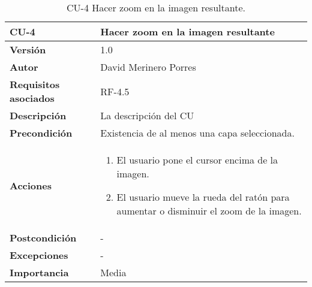 \begin{table}[p]
	\centering
	\begin{tabularx}{\linewidth}{ p{} p{} }
		\toprule
		\textbf{CU-4}    & \textbf{Hacer zoom en la imagen resultante}\\
		\toprule
		\textbf{Versión}              & 1.0    \\
		\textbf{Autor}                & David Merinero Porres \\
		\textbf{Requisitos asociados} & RF-4.5 \\
		\textbf{Descripción}          & La descripción del CU \\
		\textbf{Precondición}         & Existencia de al menos una capa seleccionada. \\
		\textbf{Acciones}             &
		\begin{enumerate}
			\def\labelenumi{\arabic{enumi}.}
			\tightlist
			\item El usuario pone el cursor encima de la imagen.
			\item El usuario mueve la rueda del ratón para aumentar o disminuir el zoom de la imagen.
		\end{enumerate}\\
		\textbf{Postcondición}        & - \\
		\textbf{Excepciones}          & - \\
		\textbf{Importancia}          & Media \\
		\bottomrule
	\end{tabularx}
	\caption{CU-4 Hacer zoom en la imagen resultante.}
\end{table}


